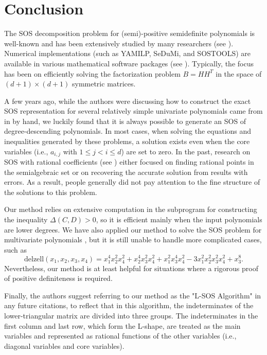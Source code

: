 \documentclass[runningheads]{llncs}
\newcommand{\Qo}{\Delta}
\begin{document}
{\section{Conclusion}

The SOS decomposition problem for (semi)-positive semidefinite polynomials is well-known and has been extensively studied by many researchers (see \cite{Motzkin1965,Choi1995,Reznick2000,Rudin2000,Oliveira2006,Harrison2007,Schmuedgen2012}). 
Numerical implementations (such as YAMILP, SeDuMi, and SOSTOOLS) are available in various mathematical software packages (see \cite{Powers1998,Parrilo2003,Parrilo2012,Powers2015}).  
Typically, the focus has been on efficiently solving the factorization problem \( B = HH^T \) in the space of \( (d+1) \times (d+1) \) symmetric matrices. 

A few years ago, while the authors were discussing how to construct the exact SOS representation for several relatively simple univariate polynomials came from in \cite{Feng1982,Feng2020} by hand, we luckily found that it is always possible to generate an SOS of degree-descending polynomials. In most cases, when solving the equations and inequalities generated by these problems, a solution exists even when the core variables (i.e., \( a_{i,j} \) with \( 1 \leq j < i \leq d \)) are set to zero. 
In the past, research on SOS with rational coefficients (see \cite{PeyrlParrilo2007a,PeyrlParrilo2007b,KLYZ2008,Kaltofen2009,KLYZ2012,Menini2015}
)  either focused on finding rational points in the semialgebraic set or on recovering the accurate solution from results with errors. As a result, people generally did not pay attention to the fine structure of the solutions to this problem.

Our method relies on extensive computation in the subprogram for constructing the inequality \( {\Qo}(C, D) > 0 \), so it is efficient mainly when the input polynomials are  lower degrees. 
We have also applied our method to solve the SOS problem for multivariate polynomials \cite{Huang2020,HZYR2024}, but it is still unable to handle more complicated cases, 
such as
$$
\text{delzell}(x_1, x_2, x_3, x_4) = x_1^4 x_2^2 x_4^2 + x_2^4 x_3^2 x_4^2 + x_1^2 x_3^4 x_4^2 - 3x_1^2 x_2^2 x_3^2 x_4^2 + x_3^8.
$$
Nevertheless, our method is at least helpful for situations where a rigorous proof of positive definiteness is required. 
\smallskip

Finally, the authors suggest referring to our method as the "L-SOS Algorithm" in any future citations, to reflect that in this algorithm, the indeterminates of the lower-triangular matrix are divided into three groups. The indeterminates in the first column and last row, which form the L-shape, are treated as the main variables and represented as rational functions of the other variables (i.e., diagonal variables and core variables).

}
\end{document}
